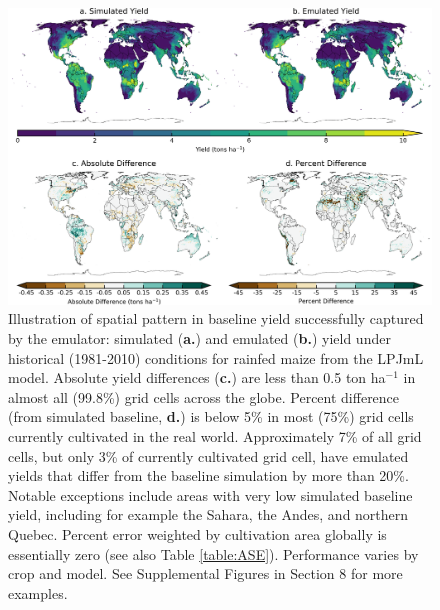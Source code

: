 \documentclass[gmd, manuscript]{copernicus} %
\begin{document}
\begin{figure}[ht]
\centering
    \includegraphics[width=16.0cm]{figures/lpjml_maize.png}
    \caption{
    Illustration of spatial pattern in baseline yield successfully captured by the emulator:
    simulated (\textbf{a.}) and emulated (\textbf{b.}) yield under historical (1981-2010) conditions for rainfed maize from the LPJmL model.
    Absolute yield differences (\textbf{c.}) are less than 0.5 ton ha$^{-1}$ in almost all (99.8\%) grid cells across the globe.
    Percent difference (from simulated baseline, \textbf{d.}) is below 5\% in most (75\%) grid cells currently cultivated in the real world.
    Approximately 7\% of all grid cells, but only 3\% of currently cultivated grid cell, have emulated yields that differ from the baseline simulation by more than 20\%.
    Notable exceptions include areas with very low simulated baseline yield, including for example the Sahara, the Andes, and northern Quebec. 
    Percent error weighted by cultivation area globally is essentially zero (see also Table \ref{table:ASE}).
    Performance varies by crop and model. 
    See Supplemental Figures in Section 8 for more examples.
    }
   \label{fig:map_pattern}
\end{figure}
\end{document}
